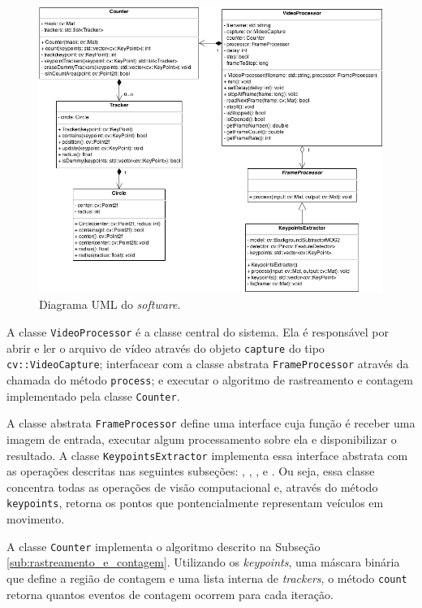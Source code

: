 \begin{figure}[ht]
  \begin{center}
    \includegraphics[scale=0.55]{imgs/uml_pfc.png}
  \end{center}
  \caption{Diagrama UML do \textit{software}.}
  \label{fig:uml}
\end{figure}

A classe \verb!VideoProcessor! é a classe central do sistema. Ela é responsável por abrir e ler o arquivo de vídeo através do objeto \verb!capture! do tipo \verb!cv::VideoCapture!; interfacear com a classe abstrata \verb!FrameProcessor! através da chamada do método \verb!process!; e executar o algoritmo de rastreamento e contagem implementado pela classe \verb!Counter!.

A classe abstrata \verb!FrameProcessor! define uma interface cuja função é receber uma imagem de entrada, executar algum processamento sobre ela e disponibilizar o resultado. A classe \verb!KeypointsExtractor! implementa essa interface abstrata com as operações descritas nas seguintes subseções: , , ,  e . Ou seja, essa classe concentra todas as operações de visão computacional e, através do método \verb!keypoints!, retorna os pontos que pontencialmente representam veículos em movimento.

A classe \verb!Counter! implementa o algoritmo descrito na Subseção \ref{sub:rastreamento_e_contagem}. Utilizando os \textit{keypoints}, uma máscara binária que define a região de contagem e uma lista interna de \textit{trackers}, o método \verb!count! retorna quantos eventos de contagem ocorrem para cada iteração.

